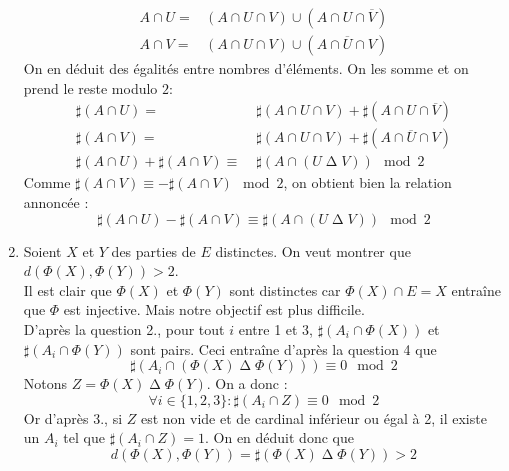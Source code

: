 \begin{enumerate}
\begin{align*}
A\cap U =& \left( A\cap U \cap V\right) \cup  \left( A\cap U \cap \overline{V}\right)\\
A\cap V =& \left( A\cap U \cap V\right) \cup  \left( A\cap \overline{U} \cap V\right)
\end{align*}
On en déduit des égalités entre nombres d'éléments. On les somme et on prend le reste modulo $2$:
\begin{align*}
\sharp(A\cap U) =& \;\sharp\left( A\cap U \cap V\right) +  \sharp\left( A\cap U \cap \overline{V}\right)\\
\sharp(A\cap V) =& \;\sharp\left( A\cap U \cap V\right) +  \sharp\left( A\cap \overline{U} \cap V\right)\\
\sharp(A\cap U)+\sharp(A\cap V) \equiv& \;\sharp\left( A\cap(U \mathop{\Delta}  V)\right) \mod 2
\end{align*}
Comme $\sharp(A\cap V) \equiv -\sharp(A\cap V) \mod 2$, on obtient bien la relation annoncée :
\begin{displaymath}
 \sharp(A\cap U) - \sharp(A\cap V) \equiv \sharp\left(A\cap (U \mathop{\Delta}  V) \right) \mod 2 
\end{displaymath}
\item Soient $X$ et $Y$ des parties de $E$ distinctes. On veut montrer que $d(\Phi(X),\Phi(Y))>2$.\\
Il est clair que $\Phi(X)$ et $\Phi(Y)$ sont distinctes car $\Phi(X)\cap E=X$ entraîne que $\Phi$ est injective. Mais notre objectif est plus difficile.\\
D'après la question 2., pour tout $i$ entre 1 et 3, $\sharp \left( A_i\cap\Phi(X)\right)$ et $\sharp \left( A_i\cap\Phi(Y)\right)$ sont pairs. Ceci entraîne d'après la question 4 que
\begin{displaymath}
 \sharp\left( A_i\cap(\Phi(X) \mathop{\Delta}  \Phi(Y))\right) \equiv 0 \mod 2 
\end{displaymath}
Notons $Z=\Phi(X) \mathop{\Delta}  \Phi(Y)$. On a donc :
\begin{displaymath}
 \forall i \in \{1,2,3\} : \sharp(A_i\cap Z) \equiv 0 \mod 2
\end{displaymath}
Or d'après 3., si $Z$ est non vide et de cardinal inférieur ou égal à 2, il existe un $A_i$ tel que $\sharp(A_i\cap Z)=1$. On en déduit donc que
\begin{displaymath}
 d(\Phi(X),\Phi(Y))= \sharp(\Phi(X) \mathop{\Delta}  \Phi(Y))>2
\end{displaymath} 


\end{enumerate}
